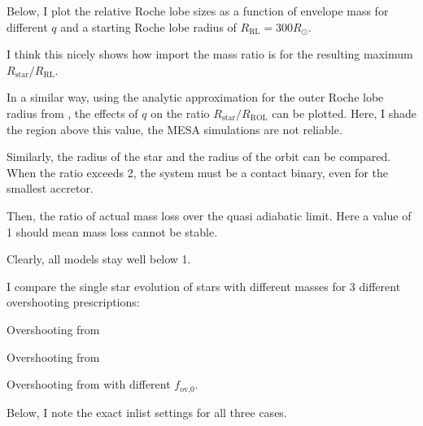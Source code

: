 \documentclass[a4paper,10pt]{article}
\begin{document}
Below, I plot the relative Roche lobe sizes as a function of envelope mass for different \(q\) and a starting Roche lobe radius of \(R_\text{RL} = 300 R_\odot \).

\begin{figure}[ht]
    \centering
\end{figure}
I think this nicely shows how import the mass ratio is for the resulting maximum \(R_\text{star} / R_\text{RL}\).

\nextpage

In a similar way, using the analytic approximation for the outer Roche lobe radius from \citet{temmink2022}, the effects of \(q\) on the ratio \(R_\text{star} / R_\text{ROL}\) can be plotted. Here, I shade the region above this value, the MESA simulations are not reliable.
\begin{figure}[ht]
    \centering
\end{figure}

Similarly, the radius of the star and the radius of the orbit can be compared. When the ratio exceeds 2, the system must be a contact binary, even for the smallest accretor. 

\begin{figure}[ht]
    \centering
\end{figure}

Then, the ratio of actual mass loss over the quasi adiabatic limit. Here a value of 1 should mean mass loss cannot be stable.

\begin{figure}[ht]
    \centering
\end{figure}

Clearly, all models stay well below 1.



I compare the single star evolution of stars with different masses for 3 different overshooting prescriptions:
\begin{enumd}
    \item  Overshooting from \citet{rees2024b}
    \item  Overshooting from \citet{temmink2022}
    \item  Overshooting from \citet{temmink2022} with different \(f_\text{ov,0}\).
\end{enumd}

Below, I note the exact inlist settings for all three cases.
\end{document}
